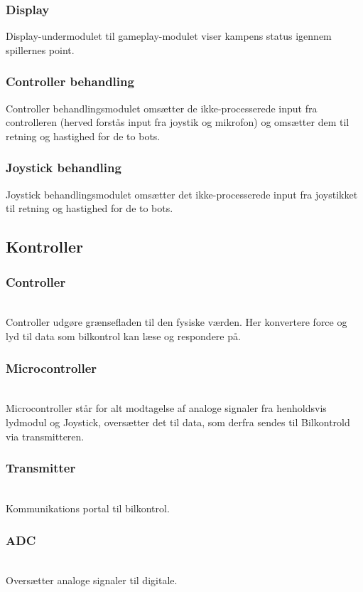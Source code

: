 \subsubsection*{\textbf{Display}}
Display-undermodulet til gameplay-modulet viser kampens status igennem spillernes point. 
\subsubsection*{\textbf{Controller behandling}}
Controller behandlingsmodulet omsætter de ikke-processerede input fra controlleren (herved forstås input fra joystik og mikrofon) og omsætter dem til retning og hastighed for de to bots.  
\subsubsection*{\textbf{Joystick behandling}}
Joystick behandlingsmodulet omsætter det ikke-processerede input fra joystikket til retning og hastighed for de to bots.



\subsection{Kontroller} 
\subsubsection*{\textbf{Controller}}\hfill\\
Controller udgøre grænsefladen til den fysiske værden. Her konvertere force og lyd til data som bilkontrol kan læse og respondere på.
\subsubsection*{\textbf{Microcontroller}}\hfill\\
Microcontroller står for alt modtagelse af analoge signaler fra henholdsvis lydmodul og Joystick, oversætter det til data, som derfra sendes til Bilkontrold via transmitteren.
\subsubsection*{\textbf{Transmitter}}\hfill\\
Kommunikations portal til bilkontrol.
\subsubsection*{\textbf{ADC}}\hfill\\
Oversætter analoge signaler til digitale.
